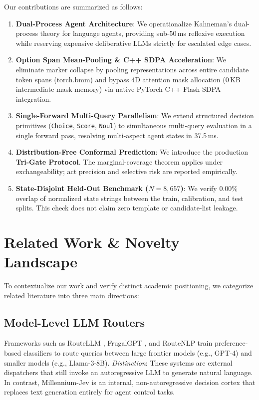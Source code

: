 \documentclass[11pt,a4paper]{article}
\begin{document}
Our contributions are summarized as follows:
\begin{enumerate}
    \item \textbf{Dual-Process Agent Architecture}: We operationalize Kahneman's dual-process theory for language agents, providing sub-50\,ms reflexive execution while reserving expensive deliberative LLMs strictly for escalated edge cases.
    \item \textbf{Option Span Mean-Pooling \& C++ SDPA Acceleration}: We eliminate marker collapse by pooling representations across entire candidate token spans ($\text{torch.bmm}$) and bypass 4D attention mask allocation ($0$\,KB intermediate mask memory) via native PyTorch C++ Flash-SDPA integration.
    \item \textbf{Single-Forward Multi-Query Parallelism}: We extend structured decision primitives (\texttt{Choice}, \texttt{Score}, \texttt{Noul}) to simultaneous multi-query evaluation in a single forward pass, resolving multi-aspect agent states in 37.5\,ms.
    \item \textbf{Distribution-Free Conformal Prediction}: We introduce the production \textbf{Tri-Gate Protocol}. The marginal-coverage theorem applies under exchangeability; act precision and selective risk are reported empirically.
    \item \textbf{State-Disjoint Held-Out Benchmark ($N=8,657$)}: We verify $0.00\%$ overlap of normalized state strings between the train, calibration, and test splits. This check does not claim zero template or candidate-list leakage.
\end{enumerate}

\section{Related Work \& Novelty Landscape}

To contextualize our work and verify distinct academic positioning, we categorize related literature into three main directions:

\subsection{Model-Level LLM Routers}
Frameworks such as RouteLLM \cite{ong2024routellm}, FrugalGPT \cite{chen2023frugalgpt}, and RouteNLP \cite{ding2024routenlp} train preference-based classifiers to route queries between large frontier models (e.g., GPT-4) and smaller models (e.g., Llama-3-8B). \textit{Distinction}: These systems are external dispatchers that still invoke an autoregressive LLM to generate natural language. In contrast, Millennium-Jev is an internal, non-autoregressive decision cortex that replaces text generation entirely for agent control tasks.
\end{document}
